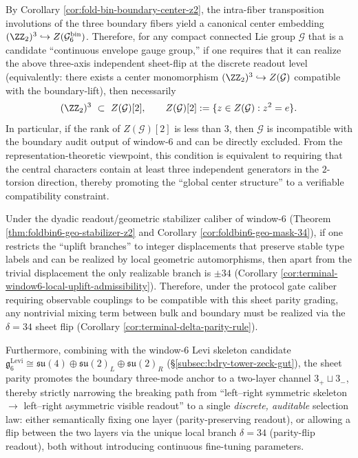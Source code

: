 \begin{remark}\label{rem:bdry-center-z2-global-compatibility}
By Corollary \ref{cor:fold-bin-boundary-center-z2}, the intra-fiber transposition involutions of the three boundary fibers yield a canonical center embedding
\(
(\ZZ_2)^3\hookrightarrow Z(\mathcal{G}^{\mathrm{bin}}_6)
\).
Therefore, for any compact connected Lie group \(\mathcal G\) that is a candidate ``continuous envelope gauge group,'' if one requires that it can realize the above three-axis independent sheet-flip at the discrete readout level (equivalently: there exists a center monomorphism \((\ZZ_2)^3\hookrightarrow Z(\mathcal G)\) compatible with the boundary-lift), then necessarily
\[
(\ZZ_2)^3\ \subset\ Z(\mathcal G)[2],
\qquad
Z(\mathcal G)[2]:=\{z\in Z(\mathcal G):z^2=e\}.
\]
In particular, if the rank of \(Z(\mathcal G)[2]\) is less than \(3\), then \(\mathcal G\) is incompatible with the boundary audit output of window-\(6\) and can be directly excluded.
From the representation-theoretic viewpoint, this condition is equivalent to requiring that the central characters contain at least three independent generators in the \(2\)-torsion direction, thereby promoting the ``global center structure'' to a verifiable compatibility constraint.
\end{remark}

\begin{proposition}[Geometric Realizability of \texorpdfstring{$\delta=34$}{delta=34} and Discrete Symmetry-Breaking Channels]\label{prop:bdry-sheet-parity-discrete-breaking}
Under the dyadic readout/geometric stabilizer caliber of window-\(6\) (Theorem \ref{thm:foldbin6-geo-stabilizer-z2} and Corollary \ref{cor:foldbin6-geo-mask-34}), if one restricts the ``uplift branches'' to integer displacements that preserve stable type labels and can be realized by local geometric automorphisms, then apart from the trivial displacement the only realizable branch is \(\pm 34\) (Corollary \ref{cor:terminal-window6-local-uplift-admissibility}).
Therefore, under the protocol gate caliber requiring observable couplings to be compatible with this sheet parity grading, any nontrivial mixing term between bulk and boundary must be realized via the \(\delta=34\) sheet flip (Corollary \ref{cor:terminal-delta-parity-rule}).
\par
Furthermore, combining with the window-\(6\) Levi skeleton candidate \(\mathfrak g^{\mathrm{Levi}}_6\cong \mathfrak{su}(4)\oplus\mathfrak{su}(2)_L\oplus\mathfrak{su}(2)_R\) (\S\ref{subsec:bdry-tower-zeck-gut}), the sheet parity promotes the boundary three-mode anchor to a two-layer channel \(3_+\sqcup 3_-\), thereby strictly narrowing the breaking path from ``left--right symmetric skeleton \(\to\) left--right asymmetric visible readout'' to a single \emph{discrete, auditable} selection law: either semantically fixing one layer (parity-preserving readout), or allowing a flip between the two layers via the unique local branch \(\delta=34\) (parity-flip readout), both without introducing continuous fine-tuning parameters.
\end{proposition}

